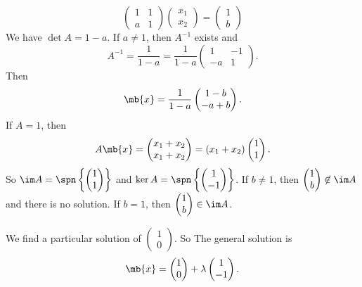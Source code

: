 \documentclass[a4paper]{article}
\begin{document}
\begin{eg}
  \[
  \begin{pmatrix}
    1 & 1\\
    a & 1
  \end{pmatrix}
  \begin{pmatrix}
    x_1\\
    x_2
  \end{pmatrix} =
  \begin{pmatrix}
    1\\
    b
  \end{pmatrix}
  \]
  We have $\det A = 1 - a$. If $a \not= 1$, then $A^{-1}$ exists and
  \[
  A^{-1} = \frac{1}{1 - a} = \frac{1}{1 - a}\begin{pmatrix}
    1 & -1\\
    -a & 1
  \end{pmatrix}.
  \]
  Then
  \[
  \mb{x} = \frac{1}{1- a}\begin{pmatrix}
    1 - b\\
    -a + b
  \end{pmatrix}.
  \]
  If $A = 1$, then
  \[
  A\mb{x} = \begin{pmatrix}
    x_1 + x_2\\
    x_1 + x_2
  \end{pmatrix} = (x_1 + x_2)\begin{pmatrix}
    1\\
    1
  \end{pmatrix}.
  \]
  So $\im A = \spn\left\{
  \begin{pmatrix}
    1\\1
  \end{pmatrix}
  \right\}$ and $\ker A = \spn\left\{
  \begin{pmatrix}
    1\\-1
  \end{pmatrix}
  \right\}$. If $b \not=1 $, then $\begin{pmatrix}
    1\\b
  \end{pmatrix}
  \not\in \im A$ and there is no solution. If $b = 1$, then $
  \begin{pmatrix}
    1\\b
  \end{pmatrix}
  \in \im A$.

  We find a particular solution of
  $\begin{pmatrix}
    1\\
    0
  \end{pmatrix}$. So The general solution is
  \[
  \mb{x} =
  \begin{pmatrix}
    1\\0
  \end{pmatrix}
  + \lambda
  \begin{pmatrix}
    1\\-1
  \end{pmatrix}.
  \]
\end{eg}
\end{document}
